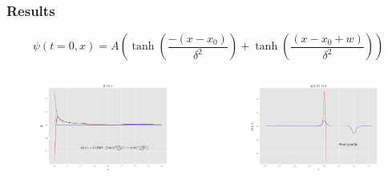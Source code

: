 \documentclass[hyperref={bookmarks=false},aspectratio=169]{beamer}
\begin{document}
\begin{frame}
  \frametitle{Results}

  \begin{equation*}
    \psi(t=0, x)=A\left(\tanh \left(\frac{-\left(x-x_{0}\right)}{\delta^{2}}\right)+\tanh \left(\frac{\left(x-x_{0}+w\right)}{\delta^{2}}\right)\right)
  \end{equation*}

  \begin{columns}
    \begin{figure}
      \centering
      \includegraphics[width=1\linewidth]{images/super_shell.pdf}
    \end{figure}
    \begin{figure}
      \centering
      \includegraphics[width=1\linewidth]{images/at0_shell.pdf}
    \end{figure}
  \end{columns}

\end{frame}
\end{document}
